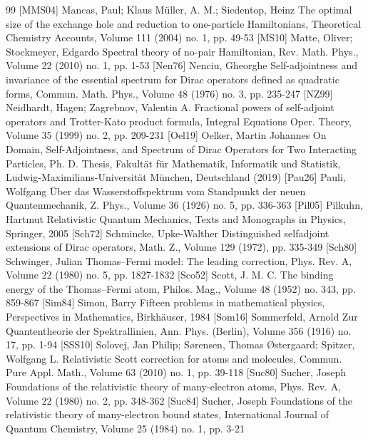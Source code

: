 \documentclass[10pt]{amsart}
\theoremstyle{definition}
\begin{document}
\begin{thebibliography}{99}
 [MMS04] Mancas, Paul; Klaus Müller, A. M.; Siedentop, Heinz The optimal size of the exchange hole and reduction to one-particle Hamiltonians, Theoretical Chemistry Accounts, Volume 111 (2004) no. 1, pp. 49-53
 [MS10] Matte, Oliver; Stockmeyer, Edgardo Spectral theory of no-pair Hamiltonian, Rev. Math. Phys., Volume 22 (2010) no. 1, pp. 1-53
 [Nen76] Nenciu, Gheorghe Self-adjointness and invariance of the essential spectrum for Dirac operators defined as quadratic forms, Commun. Math. Phys., Volume 48 (1976) no. 3, pp. 235-247
 [NZ99] Neidhardt, Hagen; Zagrebnov, Valentin A. Fractional powers of self-adjoint operators and Trotter-Kato product formula, Integral Equations Oper. Theory, Volume 35 (1999) no. 2, pp. 209-231
 [Oel19] Oelker, Martin Johannes On Domain, Self-Adjointness, and Spectrum of Dirac Operators for Two Interacting Particles, Ph. D. Thesis, Fakultät für Mathematik, Informatik und Statistik, Ludwig-Maximilians-Universität München, Deutschland (2019)
 [Pau26] Pauli, Wolfgang Über das Wasserstoffspektrum vom Standpunkt der neuen Quantenmechanik, Z. Phys., Volume 36 (1926) no. 5, pp. 336-363
 [Pil05] Pilkuhn, Hartmut Relativistic Quantum Mechanics, Texts and Monographs in Physics, Springer, 2005
 [Sch72] Schmincke, Upke-Walther Distinguished selfadjoint extensions of Dirac operators, Math. Z., Volume 129 (1972), pp. 335-349
 [Sch80] Schwinger, Julian Thomas–Fermi model: The leading correction, Phys. Rev. A, Volume 22 (1980) no. 5, pp. 1827-1832
 [Sco52] Scott, J. M. C. The binding energy of the Thomas–Fermi atom, Philos. Mag., Volume 48 (1952) no. 343, pp. 859-867
 [Sim84] Simon, Barry Fifteen problems in mathematical physics, Perspectives in Mathematics, Birkhäuser, 1984
 [Som16] Sommerfeld, Arnold Zur Quantentheorie der Spektrallinien, Ann. Phys. (Berlin), Volume 356 (1916) no. 17, pp. 1-94
 [SSS10] Solovej, Jan Philip; Sørensen, Thomas Østergaard; Spitzer, Wolfgang L. Relativistic Scott correction for atoms and molecules, Commun. Pure Appl. Math., Volume 63 (2010) no. 1, pp. 39-118
 [Suc80] Sucher, Joseph Foundations of the relativistic theory of many-electron atoms, Phys. Rev. A, Volume 22 (1980) no. 2, pp. 348-362
 [Suc84] Sucher, Joseph Foundations of the relativistic theory of many-electron bound states, International Journal of Quantum Chemistry, Volume 25 (1984) no. 1, pp. 3-21

\end{thebibliography}
\end{document}
